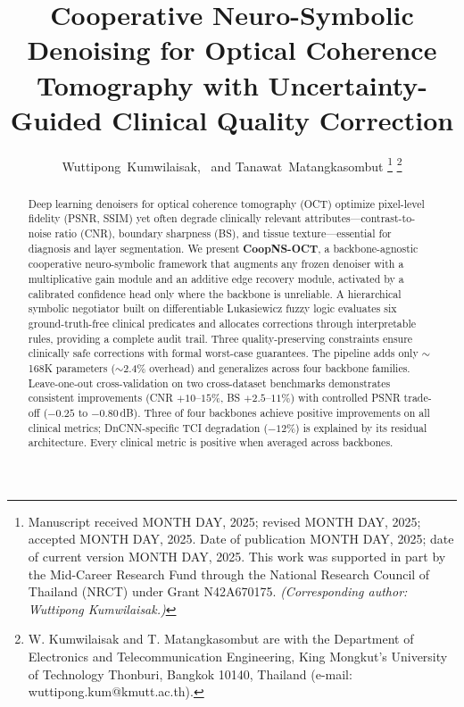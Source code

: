 \documentclass[journal,twoside,web]{ieeecolor}
\begin{document}
\title{Cooperative Neuro-Symbolic Denoising for Optical Coherence Tomography with Uncertainty-Guided Clinical Quality Correction}
\author{Wuttipong~Kumwilaisak,~
and Tanawat~Matangkasombut%
\thanks{Manuscript received MONTH DAY, 2025; revised MONTH DAY, 2025; accepted MONTH DAY, 2025. Date of publication MONTH DAY, 2025; date of current version MONTH DAY, 2025. This work was supported in part by the Mid-Career Research Fund through the National Research Council of Thailand (NRCT) under Grant N42A670175. \emph{(Corresponding author: Wuttipong Kumwilaisak.)}}
\thanks{W. Kumwilaisak and T. Matangkasombut are with the Department of Electronics and Telecommunication Engineering, King Mongkut's University of Technology Thonburi, Bangkok 10140, Thailand (e-mail: wuttipong.kum@kmutt.ac.th).}}

\maketitle

\begin{abstract}
Deep learning denoisers for optical coherence tomography (OCT) optimize pixel-level fidelity (PSNR, SSIM) yet often degrade clinically relevant attributes---contrast-to-noise ratio (CNR), boundary sharpness (BS), and tissue texture---essential for diagnosis and layer segmentation.
We present \textbf{CoopNS-OCT}, a backbone-agnostic cooperative neuro-symbolic framework that augments any frozen denoiser with a multiplicative gain module and an additive edge recovery module, activated by a calibrated confidence head only where the backbone is unreliable. A hierarchical symbolic negotiator built on differentiable Lukasiewicz fuzzy logic evaluates six ground-truth-free clinical predicates and allocates corrections through interpretable rules, providing a complete audit trail. Three quality-preserving constraints ensure clinically safe corrections with formal worst-case guarantees.
The pipeline adds only ${\sim}$168K parameters (${\sim}$2.4\% overhead) and generalizes across four backbone families. Leave-one-out cross-validation on two cross-dataset benchmarks demonstrates consistent improvements (CNR $+10$--$15\%$, BS $+2.5$--$11\%$) with controlled PSNR trade-off ($-0.25$ to $-0.80$\,dB). Three of four backbones achieve positive improvements on all clinical metrics; DnCNN-specific TCI degradation ($-12\%$) is explained by its residual architecture. Every clinical metric is positive when averaged across backbones.
\end{abstract}
\end{document}

